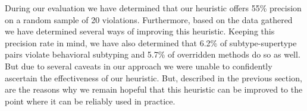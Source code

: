 \documentclass{acm_proc_article-sp}
\begin{document}
During our evaluation we have determined that our heuristic offers 55\% precision on a random sample of 20 violations. Furthermore, based on the data gathered we have determined several ways of improving this heuristic. Keeping this precision rate in mind, we have also determined that 6.2\% of subtype-supertype pairs violate behavioral subtyping and 5.7\% of overridden methods do so as well. But due to several caveats in our approach we were unable to confidently ascertain the effectiveness of our heuristic. But, described in the previous section, are the reasons why we remain hopeful that this heuristic can be improved to the point where it can be reliably used in practice.

%
%
%
\end{document}
